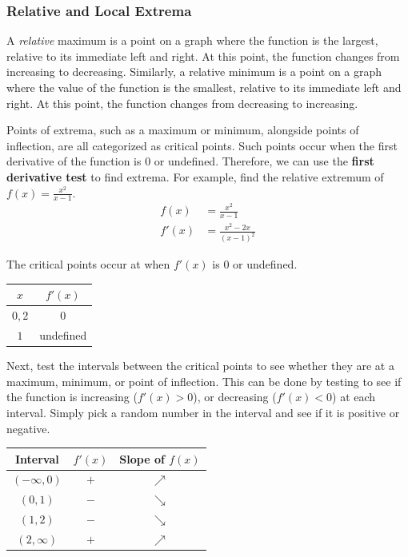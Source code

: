 \documentclass[12pt]{article}
\begin{document}
\subsubsection{Relative and Local Extrema}
A \textit{relative} maximum is a point on a graph where the function is the largest, relative to its immediate left and right. At this point, the function changes from increasing to decreasing. Similarly, a relative minimum is a point on a graph where the value of the function is the smallest, relative to its immediate left and right. At this point, the function changes from decreasing to increasing.

Points of extrema, such as a maximum or minimum, alongside points of inflection, are all categorized as critical points. Such points occur when the first derivative of the function is $0$ or undefined. Therefore, we can use the \textbf{first derivative test} to find extrema. For example, find the relative extremum of $f(x) = \frac{x^2}{x - 1}$.
\begin{align*}
	f(x) &= \frac{x^2}{x - 1} \\[5pt]
	f'(x) &= \frac{x^2 - 2x}{(x - 1)^2}
\end{align*}

\noindent The critical points occur at when $f'(x)$ is $0$ or undefined.
\begin{table}[H]
	\centering
	\begin{tabular}{|c|c|}
		\hline
		$x$ & $f'(x)$ \\
		\hline \hline
		$0, 2$ & $0$ \\
		\hline
		$1$ & undefined \\
		\hline
	\end{tabular}
\end{table}

\noindent Next, test the intervals between the critical points to see whether they are at a maximum, minimum, or point of inflection. This can be done by testing to see if the function is increasing ($f'(x) > 0$), or decreasing ($f'(x) < 0$) at each interval. Simply pick a random number in the interval and see if it is positive or negative.
\begin{table}[H]
	\centering
	\begin{tabular}{|c|c|c|}
		\hline
		Interval & $f'(x)$ & Slope of $f(x)$ \\
		\hline \hline
		$(-\infty, 0)$ & $+$ & $\nearrow$ \\
		\hline
		$(0, 1)$ & $-$ & $\searrow$ \\
		\hline
		$(1, 2)$ & $-$ & $\searrow$ \\
		\hline
		$(2, \infty)$ & $+$ & $\nearrow$ \\
		\hline
	\end{tabular}
\end{table}
\end{document}
